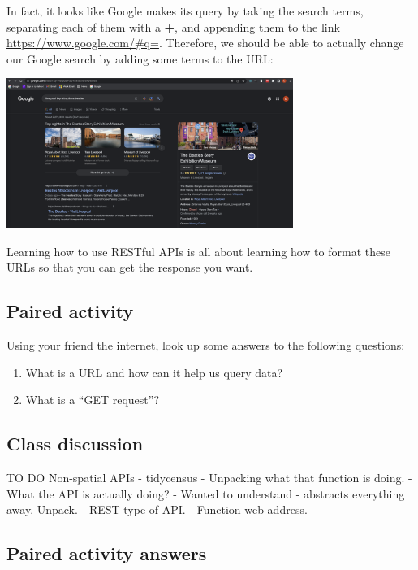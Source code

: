 \documentclass[
  letterpaper,
  DIV=11,
  numbers=noendperiod]{scrreprt}
\begin{document}
In fact, it looks like Google makes its query by taking the search
terms, separating each of them with a \textbf{+}, and appending them to
the link \url{https://www.google.com/\#q=}. Therefore, we should be able
to actually change our Google search by adding some terms to the URL:

\includegraphics[width=0.7\textwidth,height=\textheight]{././img/beatles.png}

Learning how to use RESTful APIs is all about learning how to format
these URLs so that you can get the response you want.

\hypertarget{paired-activity-1}{%
\subsection{Paired activity}\label{paired-activity-1}}

Using your friend the internet, look up some answers to the following
questions:

\begin{enumerate}
\def\labelenumi{\arabic{enumi}.}
\item
  What is a URL and how can it help us query data?
\item
  What is a ``GET request''?
\end{enumerate}

\hypertarget{class-discussion-1}{%
\subsection{Class discussion}\label{class-discussion-1}}

TO DO Non-spatial APIs - tidycensus - Unpacking what that function is
doing. - What the API is actually doing? - Wanted to understand -
abstracts everything away. Unpack. - REST type of API. - Function web
address.

\hypertarget{paired-activity-answers}{%
\subsection{Paired activity answers}\label{paired-activity-answers}}
\end{document}
